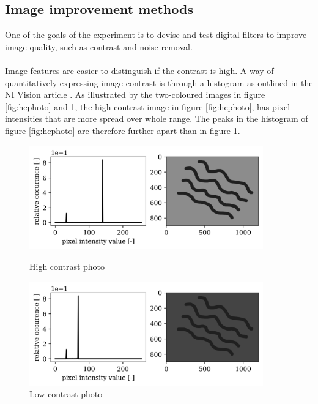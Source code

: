 \subsection{Image improvement methods}
One of the goals of the experiment is to devise and test digital filters to improve image quality, such as contrast and noise removal.\\
\\
Image features are easier to distinguish if the contrast is high. A way of quantitatively expressing image contrast is through a histogram as outlined in the NI Vision article \cite{histogram_theory}. As illustrated by the two-coloured images in figure \ref{fig:hcphoto} and \ref{fig:lcphoto}, the high contrast image in figure \ref{fig:hcphoto}, has pixel intensities that are more spread over whole range. The peaks in the histogram of figure \ref{fig:hcphoto} are therefore further apart than in figure \ref{fig:lcphoto}.

\begin{figure}[h!]
    \centering
    \begin{minipage}{.5\textwidth}
      \centering
      \includegraphics[width=0.9\textwidth,keepaspectratio]{afbeeldingen/histograms/highcontrast.png}
      \caption{High contrast photo}
      \label{fig:hcphoto}
    \end{minipage}%
    \begin{minipage}{.5\textwidth}
      \centering
      \includegraphics[width=0.9\textwidth,keepaspectratio]{afbeeldingen/histograms/lowcontrast.png}
      \caption{Low contrast photo}
      \label{fig:lcphoto}
    \end{minipage}
\end{figure}

